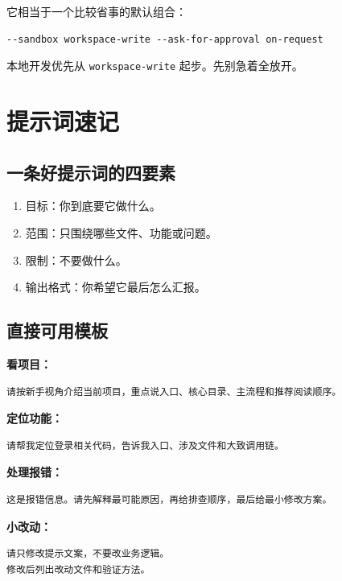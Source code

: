 \documentclass[UTF8,a4paper,11pt]{ctexart}
\begin{document}
它相当于一个比较省事的默认组合：

\begin{lstlisting}[style=cli]
--sandbox workspace-write --ask-for-approval on-request
\end{lstlisting}

\begin{sumbox}
本地开发优先从 \texttt{workspace-write} 起步。先别急着全放开。
\end{sumbox}

\section{提示词速记}

\subsection{一条好提示词的四要素}

\begin{enumerate}
  \item 目标：你到底要它做什么。
  \item 范围：只围绕哪些文件、功能或问题。
  \item 限制：不要做什么。
  \item 输出格式：你希望它最后怎么汇报。
\end{enumerate}

\subsection{直接可用模板}

\textbf{看项目：}
\begin{lstlisting}[style=prompt]
请按新手视角介绍当前项目，重点说入口、核心目录、主流程和推荐阅读顺序。
\end{lstlisting}

\textbf{定位功能：}
\begin{lstlisting}[style=prompt]
请帮我定位登录相关代码，告诉我入口、涉及文件和大致调用链。
\end{lstlisting}

\textbf{处理报错：}
\begin{lstlisting}[style=prompt]
这是报错信息。请先解释最可能原因，再给排查顺序，最后给最小修改方案。
\end{lstlisting}

\textbf{小改动：}
\begin{lstlisting}[style=prompt]
请只修改提示文案，不要改业务逻辑。
修改后列出改动文件和验证方法。
\end{lstlisting}
\end{document}
